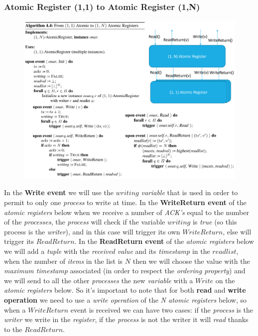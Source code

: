 \documentclass{article}
\begin{document}
\subsubsection{Atomic Register (1,1) to Atomic Register (1,N)}
\begin{figure}[H]
  \centering
  \includegraphics[scale=0.65,left]{cattura72.png}
\end{figure}
In the \textbf{Write event} we will use the $writing$ \emph{variable} that is used in order to permit to only one \emph{process} to write at time. In the\textbf{ WriteReturn event} of the \emph{atomic registers} below when we receive a number of \emph{ACK's} equal to the number of the \emph{processes}, the \emph{process} will check if the variable $writing$ is \emph{true} (so this process is the \emph{writer}), and in this case will trigger its own $WriteReturn$, else will trigger its $ReadReturn$. In the \textbf{ReadReturn event} of the \emph{atomic registers} below we will add a \emph{tuple} with the \emph{received value} and its \emph{timestamp} in the $readlist$, when the number of \emph{items} in the list is $N$ then we will choose the value with the \emph{maximum timestamp} associated (in order to respect the \emph{ordering property}) and we will send to all the other \emph{processes} the new \emph{variable} with a $Write$ on the \emph{atomic registers} below. So it's important to note that for both \textbf{read} and \textbf{write operation} we need to use a \emph{write operation} of the \emph{N atomic registers} below, so when a $WriteReturn$ event is received we can have two cases: if the \emph{process} is the \emph{writer} we write in the \emph{register}, if the \emph{process} is not the writer it will \emph{read} thanks to the $ReadReturn$. 
\end{document}
